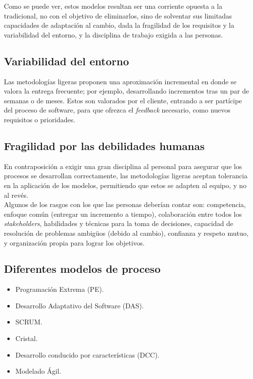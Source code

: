 Como se puede ver, estos modelos resultan ser una corriente opuesta a la tradicional, no con el objetivo de eliminarlos, sino de solventar sus limitadas capacidades de adaptación al cambio, dada la fragilidad de los requisitos y la variabilidad del entorno, y la disciplina de trabajo exigida a las personas.\\

\subsection{Variabilidad del entorno}

Las metodologías ligeras proponen una aproximación incremental en donde se valora la entrega frecuente; por ejemplo, desarrollando incrementos tras un par de semanas o de meses. Estos son valorados por el cliente, entrando a ser partícipe del proceso de software, para que ofrezca el \textit{feedback} necesario, como nuevos requisitos o prioridades.

\subsection{Fragilidad por las debilidades humanas}

En contraposición a exigir una gran disciplina al personal para asegurar que los procesos se desarrollan correctamente, las metodologías ligeras aceptan tolerancia en la aplicación de los modelos, permitiendo que estos se adapten al equipo, y no al revés.\\

Algunos de los rasgos con los que las personas deberían contar son: competencia, enfoque común (entregar un incremento a tiempo), colaboración entre todos los \textit{stakeholders}, habilidades y técnicas para la toma de decisiones, capacidad de resolución de problemas ambigüos (debido al cambio), confianza y respeto mutuo, y organización propia para lograr los objetivos.

\subsection{Diferentes modelos de proceso}

\begin{itemize}
   \item Programación Extrema (PE).
   \item Desarrollo Adaptativo del Software (DAS).
   \item SCRUM.
   \item Cristal.
   \item Desarrollo conducido por características (DCC).
   \item Modelado Ágil.
\end{itemize}

